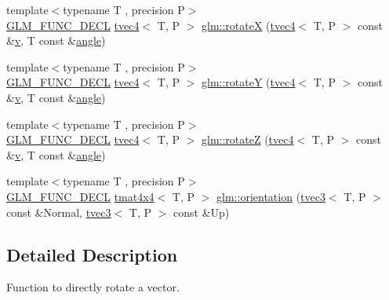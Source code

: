 \begin{DoxyCompactItemize}
{\footnotesize template$<$typename T , precision P$>$ }\\\mbox{\hyperlink{setup_8hpp_ab2d052de21a70539923e9bcbf6e83a51}{G\+L\+M\+\_\+\+F\+U\+N\+C\+\_\+\+D\+E\+CL}} \mbox{\hyperlink{structglm_1_1tvec4}{tvec4}}$<$ T, P $>$ \mbox{\hyperlink{group__gtx__rotate__vector_gadab312d430a564741ae02215255027a0}{glm\+::rotateX}} (\mbox{\hyperlink{structglm_1_1tvec4}{tvec4}}$<$ T, P $>$ const \&\mbox{\hyperlink{glad_8h_a14cfbe2fc2234f5504618905b69d1e06}{v}}, T const \&\mbox{\hyperlink{group__gtc__quaternion_gad4a4448baedb198b2b1e7880d2544dc9}{angle}})
\item 
{\footnotesize template$<$typename T , precision P$>$ }\\\mbox{\hyperlink{setup_8hpp_ab2d052de21a70539923e9bcbf6e83a51}{G\+L\+M\+\_\+\+F\+U\+N\+C\+\_\+\+D\+E\+CL}} \mbox{\hyperlink{structglm_1_1tvec4}{tvec4}}$<$ T, P $>$ \mbox{\hyperlink{group__gtx__rotate__vector_gae2507577c4bffa3548b32852791dd90c}{glm\+::rotateY}} (\mbox{\hyperlink{structglm_1_1tvec4}{tvec4}}$<$ T, P $>$ const \&\mbox{\hyperlink{glad_8h_a14cfbe2fc2234f5504618905b69d1e06}{v}}, T const \&\mbox{\hyperlink{group__gtc__quaternion_gad4a4448baedb198b2b1e7880d2544dc9}{angle}})
\item 
{\footnotesize template$<$typename T , precision P$>$ }\\\mbox{\hyperlink{setup_8hpp_ab2d052de21a70539923e9bcbf6e83a51}{G\+L\+M\+\_\+\+F\+U\+N\+C\+\_\+\+D\+E\+CL}} \mbox{\hyperlink{structglm_1_1tvec4}{tvec4}}$<$ T, P $>$ \mbox{\hyperlink{group__gtx__rotate__vector_ga034e5d197ab4bd8685624bc2cf16e586}{glm\+::rotateZ}} (\mbox{\hyperlink{structglm_1_1tvec4}{tvec4}}$<$ T, P $>$ const \&\mbox{\hyperlink{glad_8h_a14cfbe2fc2234f5504618905b69d1e06}{v}}, T const \&\mbox{\hyperlink{group__gtc__quaternion_gad4a4448baedb198b2b1e7880d2544dc9}{angle}})
\item 
{\footnotesize template$<$typename T , precision P$>$ }\\\mbox{\hyperlink{setup_8hpp_ab2d052de21a70539923e9bcbf6e83a51}{G\+L\+M\+\_\+\+F\+U\+N\+C\+\_\+\+D\+E\+CL}} \mbox{\hyperlink{structglm_1_1tmat4x4}{tmat4x4}}$<$ T, P $>$ \mbox{\hyperlink{group__gtx__rotate__vector_ga49b4d082305cdfcfe0a5c184f684a902}{glm\+::orientation}} (\mbox{\hyperlink{structglm_1_1tvec3}{tvec3}}$<$ T, P $>$ const \&Normal, \mbox{\hyperlink{structglm_1_1tvec3}{tvec3}}$<$ T, P $>$ const \&Up)
\end{DoxyCompactItemize}


\subsection{Detailed Description}
Function to directly rotate a vector. 

